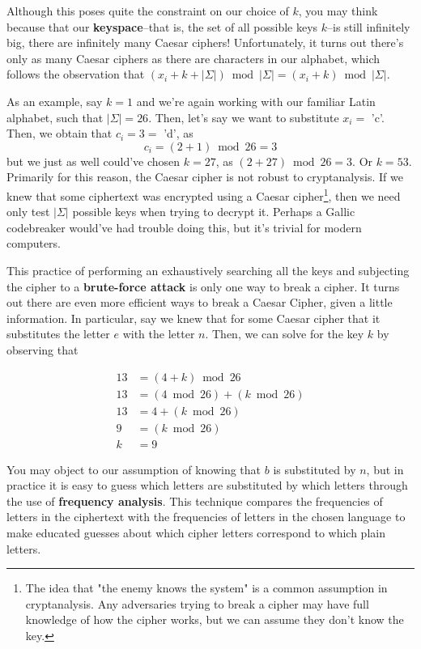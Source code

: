 \documentclass{paper}
\begin{document}
Although this poses quite the constraint on our choice of $k$, you may think because that our \textbf{keyspace}--that is, the set of all possible keys $k$--is still infinitely big, there are infinitely many Caesar ciphers! Unfortunately, it turns out there's only as many Caesar ciphers as there are characters in our alphabet, which follows the observation that $(x_i + k +  |\Sigma|) \bmod |\Sigma| = (x_i + k) \bmod |\Sigma|$. 

\medskip
As an example, say $k = 1$ and we're again working with our familiar Latin alphabet, such that $|\Sigma| = 26$. Then, let's say we want to substitute $x_i =$ 'c'. Then, we obtain that $c_i = 3 =$ 'd', as
\[ c_i = (2 + 1) \bmod 26 = 3 \]
but we just as well could've chosen $k = 27$, as $(2 + 27) \bmod 26 = 3$. Or $k = 53$. Primarily for this reason, the Caesar cipher is not robust to cryptanalysis. If we knew that some ciphertext was encrypted using a Caesar cipher\footnote{The idea that "the enemy knows the system" is a common assumption in cryptanalysis. Any adversaries trying to break a cipher may have full knowledge of how the cipher works, but we can assume they don't know the key.}, then we need only test $|\Sigma|$ possible keys when trying to decrypt it. Perhaps a Gallic codebreaker would've had trouble doing this, but it's trivial for modern computers.

\medskip
This practice of performing an exhaustively searching all the keys and subjecting the cipher to a \textbf{brute-force attack} is only one way to break a cipher. It turns out there are even more efficient ways to break a Caesar Cipher, given a little information. In particular, say we knew that for some Caesar cipher that it substitutes the letter $e$ with the letter $n$. Then, we can solve for the key $k$ by observing that 

\begin{equation*}
    \begin{split}
    13 & = (4 + k) \bmod 26 \\
    13 & = (4 \bmod 26) + (k \bmod 26) \\
    13 & = 4 + (k \bmod 26) \\
    9 & = (k \bmod 26) \\
    k & = 9
    \end{split}
\end{equation*}

You may object to our assumption of knowing that $b$ is substituted by $n$, but in practice it is easy to guess which letters are substituted by which letters through the use of \textbf{frequency analysis}. This technique compares the frequencies of letters in the ciphertext with the frequencies of letters in the chosen language to make educated guesses about which cipher letters correspond to which plain letters. 
\end{document}
